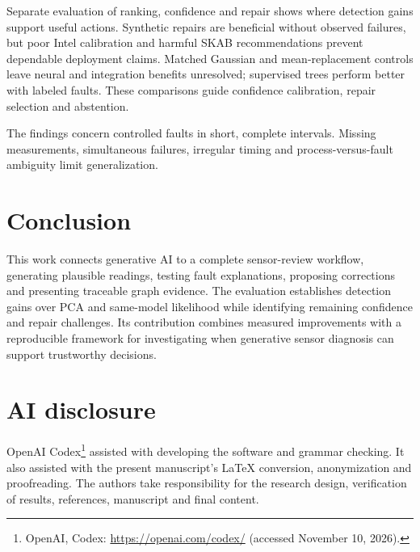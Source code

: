 \documentclass{llncs}
\newcommand{\1}{\mathbf{1}}
\begin{document}
Separate evaluation of ranking, confidence and repair shows where detection gains support useful actions. Synthetic repairs are beneficial without observed failures, but poor Intel calibration and harmful SKAB recommendations prevent dependable deployment claims. Matched Gaussian and mean-replacement controls leave neural and integration benefits unresolved; supervised trees perform better with labeled faults. These comparisons guide confidence calibration, repair selection and abstention.

The findings concern controlled faults in short, complete intervals. Missing measurements, simultaneous failures, irregular timing and process-versus-fault ambiguity limit generalization.






\section{Conclusion}
This work connects generative AI to a complete sensor-review workflow, generating plausible readings, testing fault explanations, proposing corrections and presenting traceable graph evidence. The evaluation establishes detection gains over PCA and same-model likelihood while identifying remaining confidence and repair challenges. Its contribution combines measured improvements with a reproducible framework for investigating when generative sensor diagnosis can support trustworthy decisions.

\section*{AI disclosure}
OpenAI Codex\footnote{OpenAI, Codex: \url{https://openai.com/codex/} (accessed November 10, 2026).} assisted with developing the software and grammar checking. It also assisted with the present manuscript's LaTeX conversion, anonymization and proofreading. The authors take responsibility for the research design, verification of results, references, manuscript and final content.




\end{document}
